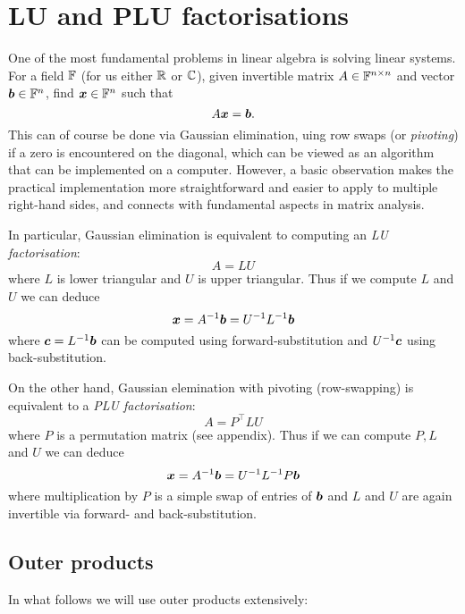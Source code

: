 
\section{LU and PLU factorisations}
One of the most fundamental problems in linear algebra is solving linear systems. For a field ${\mathbb F}$ (for us either ${\mathbb R}$ or ${\mathbb C}$), given invertible matrix $A\in {\mathbb F}^{n \times n}$ and vector $\bm{{\mbox{\boldmath$b$\unboldmath}}} \in {\mathbb F}^n$, find $\bm{{\mbox{\boldmath$x$\unboldmath}}} \in {\mathbb F}^n$ such that
\[
A \bm{{\mbox{\boldmath$x$\unboldmath}}} = \bm{{\mbox{\boldmath$b$\unboldmath}}}.
\]
This can of course be done via Gaussian elimination, uing row swaps (or \emph{pivoting}) if a zero is encountered on the diagonal, which can be viewed as an algorithm that can be implemented on a computer. However, a basic observation makes the practical implementation more straightforward and easier to apply to multiple right-hand sides, and connects with fundamental aspects in matrix analysis.

In particular, Gaussian elimination is equivalent to computing an \emph{LU factorisation}:
\[
A =L U
\]
where $L$ is lower triangular and $U$ is upper triangular. Thus if we compute $L$ and $U$ we can deduce
\[
\bm{{\mbox{\boldmath$x$\unboldmath}}} = A^{-1} \bm{{\mbox{\boldmath$b$\unboldmath}}}= U^{-1} L^{-1} \bm{{\mbox{\boldmath$b$\unboldmath}}}
\]
where  $\bm{{\mbox{\boldmath$c$\unboldmath}}} = L^{-1} \bm{{\mbox{\boldmath$b$\unboldmath}}}$ can be computed using forward-substitution and $U^{-1} \bm{{\mbox{\boldmath$c$\unboldmath}}}$ using back-substitution.

On the other hand, Gaussian elemination with pivoting (row-swapping) is equivalent to a \emph{PLU factorisation}:
\[
A = P^\ensuremath{\top} LU
\]
where $P$ is a permutation matrix (see appendix). Thus if we can compute $P, L$ and $U$ we can deduce
\[
\bm{{\mbox{\boldmath$x$\unboldmath}}} = A^{-1} \bm{{\mbox{\boldmath$b$\unboldmath}}}= U^{-1} L^{-1} P \bm{{\mbox{\boldmath$b$\unboldmath}}}
\]
where multiplication by $P$ is a simple swap of entries of $\bm{{\mbox{\boldmath$b$\unboldmath}}}$ and $L$ and $U$ are again invertible via forward- and back-substitution.

\subsection{Outer products}
In what follows we will use outer products extensively:

